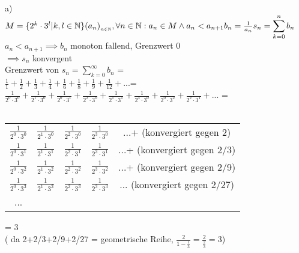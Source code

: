 a)\\
\(M = \{2^k \cdot  3^l | k,l \in \mathbb{N}\}\\
(a_n)_{_{n\in \mathbb{N}}},  \\
\forall n \in \mathbb{N} : a_n \in M \land a_n < a_{n+1}\\
b_n = \frac{1}{a_n}  \\
s_n = \displaystyle\sum_{k=0}^{n}b_n \)\\

\( a_n < a_{n+1}  \implies  b_n \) monoton fallend, Grenzwert 0 \\
\( \implies s_n \) konvergent \\
Grenzwert von \(s_n = \displaystyle\sum_{k=0}^{\infty}b_n \) = \\
\(\frac{1}{1}+\frac{1}{2}+\frac{1}{3}+\frac{1}{4}+\frac{1}{6}+\frac{1}{8}+\frac{1}{9}+\frac{1}{12}+...\)=\\
\(\frac{1}{2^0\cdot 3^0}+\frac{1}{2^1\cdot 3^0}+\frac{1}{2^0\cdot 3^1}+\frac{1}{2^2\cdot 3^0}+\frac{1}{2^1\cdot 3^1}+
\frac{1}{2^3\cdot 3^0}+\frac{1}{2^0\cdot 3^2}+\frac{1}{2^2\cdot 3^1}+...\) = \\\\

\begin{tabular}{c@{+}c@{+}c@{+}c@{+}c}
\(\frac{1}{2^0\cdot 3^0}\)&\(\frac{1}{2^1\cdot 3^0}\)&\(\frac{1}{2^2\cdot 3^0}\)&\(\frac{1}{2^3\cdot 3^0}\)&...+
\small(konvergiert gegen 2)\\
\(\frac{1}{2^0\cdot 3^1}\)&\(\frac{1}{2^1\cdot 3^1}\)&\(\frac{1}{2^2\cdot 3^1}\)&\(\frac{1}{2^3\cdot 3^1}\)&...+
\small(konvergiert gegen 2/3)\\
\(\frac{1}{2^0\cdot 3^2}\)&\(\frac{1}{2^1\cdot 3^2}\)&\(\frac{1}{2^2\cdot 3^2}\)&\(\frac{1}{2^3\cdot 3^2}\)&...+
\small(konvergiert gegen 2/9)\\
\(\frac{1}{2^0\cdot 3^3}\)&\(\frac{1}{2^1\cdot 3^3}\)&\(\frac{1}{2^2\cdot 3^3}\)&\(\frac{1}{2^3\cdot 3^3}\)&...
\small(konvergiert gegen 2/27)\\
... \\
\end{tabular} \Large = \normalsize 3\ \\
( da 2+2/3+2/9+2/27 = geometrische Reihe, \(\frac{2}{1-\frac{1}{3}} = \frac{2}{\frac{2}{3}} = 3\))\\\\

